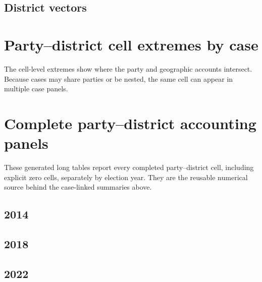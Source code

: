 \documentclass[11pt]{article}
\newcommand{\ReportLatexRoot}{../../output/decomposition/latex/report}
\begin{document}


\subsection{District vectors}



\section{Party--district cell extremes by case}

The cell-level extremes show where the party and geographic accounts
intersect. Because cases may share parties or be nested, the same cell can
appear in multiple case panels.

\begingroup
\setlength{\LTpost}{0pt}

\endgroup

\appendix
\section{Complete party--district accounting panels}

These generated long tables report every completed party--district cell,
including explicit zero cells, separately by election year. They are the
reusable numerical source behind the case-linked summaries above.

\subsection{2014}



\subsection{2018}



\subsection{2022}


\end{document}
